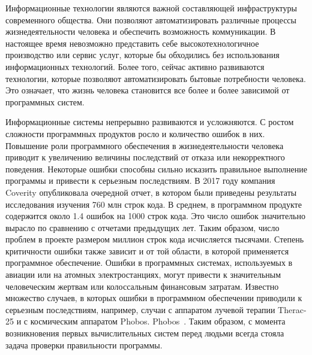 
{\actuality} Информационные технологии являются важной составляющей инфраструктуры современного общества.
Они позволяют автоматизировать различные процессы жизнедеятельности человека и обеспечить возможность коммуникации.
В настоящее время невозможно представить себе высокотехнологичное производство или сервис услуг, которые бы обходились без использования информационных технологий.
Более того, сейчас активно развиваются технологии, которые позволяют автоматизировать бытовые потребности человека.
Это означает, что жизнь человека становится все более и более зависимой от программных систем.

Информационные системы непрерывно развиваются и усложняются. 
С ростом сложности программных продуктов росло и количество ошибок в них.
Повышение роли программного обеспечения в жизнедеятельности человека приводит к увеличению величины последствий от отказа или некорректного поведения.
Некоторые ошибки способны сильно исказить правильное выполнение программы и привести к серьезным последствиям.
В 2017 году компания Coverity опубликовала очередной отчет, в котором были приведены результаты исследования изучения 760 млн строк кода.
В среднем, в программном продукте содержится около 1.4 ошибок на 1000 строк кода.
Это число ошибок значительно вырасло по сравнению с отчетами предыдущих лет.
Таким образом, число проблем в проекте размером миллион строк кода исчисляется тысячами.
Степень критичности ошибки также зависит и от той области, в которой применяется программное обеспечение.
Ошибки в программных системах, используемых в авиации или на атомных электростанциях, могут привести к значительным человеческим жертвам или колоссальным финансовым затратам.
Известно множество случаев, в которых ошибки в программном обеспечении приводили к серьезным последствиям, например, случаи с аппаратом лучевой терапии Therac-25 и с космическим аппаратом
\ifsynopsis
Phobos.
\else
Phobos~\cite{Leveson:1995}.
\fi
Таким образом, с момента возникновения первых вычислительных систем перед людьми всегда стояла задача проверки правильности программы. 


